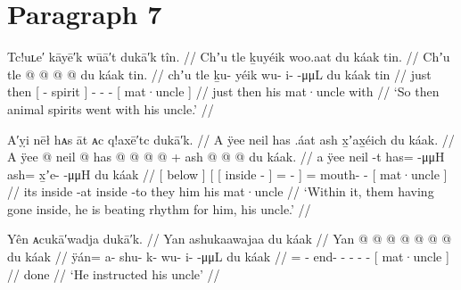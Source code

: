 \section{Paragraph 7}\label{sec:91-para-7}

\ex\label{ex:91-68-spirits-went-with-uncle}%
%
\begingl
	\glpreamble	Tc!uʟe′ kāyē′k wūā′t dukā′k tîn. //
	\glpreamble	Chʼu tle ḵuyéik woo.aat du káak tin. //
	\gla	Chʼu tle {}  @ {} {}
		 @ {} @ {} @ {}
		{} du káak tin. {} //
	\glb	chʼu tle {} ḵu- yéik {}
		wu- i-  -μμL
		{} du káak tin {} //
	\glc	just then {}[ - spirit {}]
		- -  -
		{}[  mat·uncle  {}] //
	\gld	just then {}  {} {}
		 {} {} {}
		{} his mat·uncle with {} //
	\glft	‘So then animal spirits went with his uncle.’
		//
\endgl
\xe

\ex\label{ex:91-69-inside-uncle-beat-rhythm}%
%
\begingl
	\glpreamble	A′ỵi nēł hᴀs āt ᴀc q!axē′tc dukā′k. //
	\glpreamble	A ÿee neil has .áat ash x̱ʼax̱éich du káak. //
	\gla	{} A ÿee @ {} {}
		{} {} neil @ {} {} has @  @ {} @ {} @ {} {} +
		ash @  @ {} @ {}
		{} du káak. {} //
	\glb	{} a ÿee {} {}
		{} {} neil -t {} has= {}  -μμH {} {}
		ash= x̱ʼe-  -μμH
		{} du káak {} //
	\glc	{}[  below \· {}]
		{}[ {}[ inside - {}] = \·  - \· {}]
		= mouth-  -
		{}[  mat·uncle {}] //
	\gld	{} its inside -at {}
		{} {} inside -to {} they  {} {} {} {}
		him  {} {}
		{} his mat·uncle {} //
	\glft	‘Within it, them having gone inside, he is beating rhythm for him, his uncle.’
		//
\endgl
\xe

\ex\label{ex:91-70-instruct-uncle}%
%
\begingl
	\glpreamble	Yên ᴀcukā′wadja dukā′k. //
	\glpreamble	Yan ashukaawajaa du káak //
	\gla	Yan @  @ {} @ {} @ {} @ {} @ {} @ {}
		{} du káak {} //
	\glb	ÿán= a- shu- k- wu- i-  -μμL
		{} du káak {} //
	\glc	{}= - end- - - -  -
		{}[  mat·uncle {}] //
	\gld	done  {} {} {} {} {} {} //
	\glft	‘He instructed his uncle’
		//
\endgl
\xe

